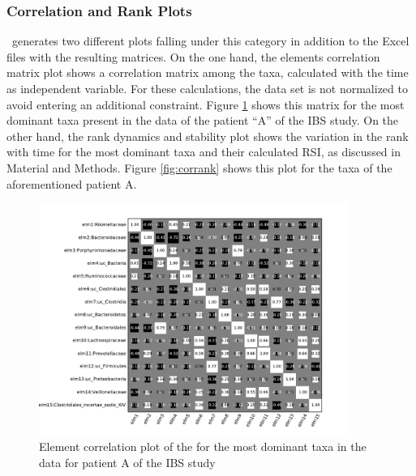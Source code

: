 \subsubsection*{Correlation and Rank Plots} 
\CC\ generates two different plots falling under this category in addition to the Excel files with the resulting matrices. On the one hand, the elements correlation matrix plot shows a correlation matrix among the taxa, calculated with the time as independent variable. For these calculations, the data set is not normalized to avoid entering an additional constraint. Figure \ref{fig:corrElm} shows this matrix for the most dominant taxa present in the data of the patient ``A'' of the IBS study\cite{IBS}. On the other hand, the rank dynamics and stability plot shows the variation in the rank with time for the most dominant taxa and their calculated RSI, as discussed in Material and Methods. Figure \ref{fig:corrank} shows this plot for the taxa of the aforementioned patient A.

\begin{figure}
	\centering
	\includegraphics[width=0.9\textwidth]{results/corrank/IBS_h_A_amplicons_family_ElmCorrelation.pdf}
	\caption{Element correlation plot of the for the most dominant taxa in the data for patient A of the IBS study\cite{IBS}}
	\label{fig:corrElm}
\end{figure}

